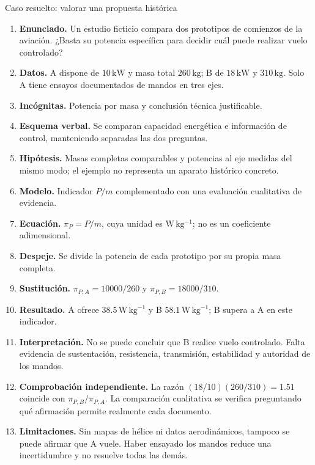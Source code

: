 \begin{studiumworked}{Caso resuelto: valorar una propuesta histórica}

\begin{enumerate}
\item \textbf{Enunciado.} Un estudio ficticio compara dos prototipos de comienzos de la aviación. ¿Basta su potencia específica para decidir cuál puede realizar vuelo controlado?
\item \textbf{Datos.} A dispone de $10\,\mathrm{kW}$ y masa total $260\,\mathrm{kg}$; B de $18\,\mathrm{kW}$ y $310\,\mathrm{kg}$. Solo A tiene ensayos documentados de mandos en tres ejes.
\item \textbf{Incógnitas.} Potencia por masa y conclusión técnica justificable.
\item \textbf{Esquema verbal.} Se comparan capacidad energética e información de control, manteniendo separadas las dos preguntas.
\item \textbf{Hipótesis.} Masas completas comparables y potencias al eje medidas del mismo modo; el ejemplo no representa un aparato histórico concreto.
\item \textbf{Modelo.} Indicador $P/m$ complementado con una evaluación cualitativa de evidencia.
\item \textbf{Ecuación.} $\pi_P=P/m$, cuya unidad es $\mathrm{W\,kg^{-1}}$; no es un coeficiente adimensional.
\item \textbf{Despeje.} Se divide la potencia de cada prototipo por su propia masa completa.
\item \textbf{Sustitución.} $\pi_{P,A}=10000/260$ y $\pi_{P,B}=18000/310$.
\item \textbf{Resultado.} A ofrece $38.5\,\mathrm{W\,kg^{-1}}$ y B $58.1\,\mathrm{W\,kg^{-1}}$; B supera a A en este indicador.
\item \textbf{Interpretación.} No se puede concluir que B realice vuelo controlado. Falta evidencia de sustentación, resistencia, transmisión, estabilidad y autoridad de los mandos.
\item \textbf{Comprobación independiente.} La razón $(18/10)(260/310)=1.51$ coincide con $\pi_{P,B}/\pi_{P,A}$. La comparación cualitativa se verifica preguntando qué afirmación permite realmente cada documento.
\item \textbf{Limitaciones.} Sin mapas de hélice ni datos aerodinámicos, tampoco se puede afirmar que A vuele. Haber ensayado los mandos reduce una incertidumbre y no resuelve todas las demás.
\end{enumerate}


\end{studiumworked}

